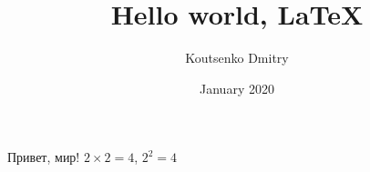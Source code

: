\documentclass[a4paper,12pt]{article}   %
\title{Hello world, LaTeX}
\author{Koutsenko Dmitry}
\date{January 2020}
\begin{document}

\maketitle
Привет, мир! $2\times2=4$, $2^2=4$
\end{document}
